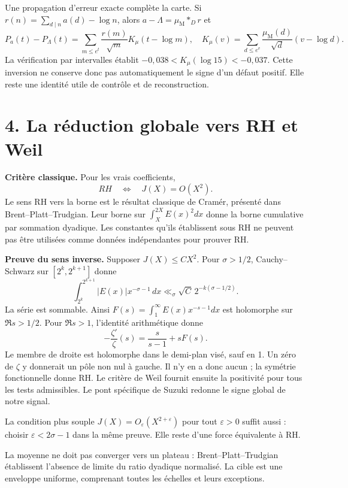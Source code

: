 \documentclass[
  11pt,
]{article}
\begin{document}
Une propagation d'erreur exacte complète la carte. Si
\(r(n)=\sum_{d\mid n}a(d)-\log n\), alors
\(a-\Lambda=\mu_{\mathrm M}*_{D}r\) et \[
P_a(t)-P_\Lambda(t)=\sum_{m\le e^t}\frac{r(m)}{\sqrt m}
K_\mu(t-\log m),
\quad K_\mu(v)=\sum_{d\le e^v}\frac{\mu_{\mathrm M}(d)}{\sqrt d}(v-\log d).
\] La vérification par intervalles établit
\(-0{,}038<K_\mu(\log15)<-0{,}037\). Cette inversion ne conserve donc
pas automatiquement le signe d'un défaut positif. Elle reste une
identité utile de contrôle et de reconstruction.

\hypertarget{la-ruxe9duction-globale-vers-rh-et-weil}{%
\section{4. La réduction globale vers RH et
Weil}\label{la-ruxe9duction-globale-vers-rh-et-weil}}

\textbf{Critère classique.} Pour les vrais coefficients, \[
RH\quad\Longleftrightarrow\quad J(X)=O(X^2).
\] Le sens RH vers la borne est le résultat classique de Cramér,
présenté dans Brent--Platt--Trudgian. Leur borne sur
\(\int_X^{2X}E(x)^2dx\) donne la borne cumulative par sommation
dyadique. Les constantes qu'ils établissent sous RH ne peuvent pas être
utilisées comme données indépendantes pour prouver RH.

\textbf{Preuve du sens inverse.} Supposer \(J(X)\le CX^2\). Pour
\(\sigma>1/2\), Cauchy--Schwarz sur \([2^k,2^{k+1}]\) donne \[
\int_{2^k}^{2^{k+1}}|E(x)|x^{-\sigma-1}\,dx
\ll_\sigma\sqrt C\,2^{-k(\sigma-1/2)}.
\] La série est sommable. Ainsi \(F(s)=\int_1^\infty E(x)x^{-s-1}dx\)
est holomorphe sur \(\Re s>1/2\). Pour \(\Re s>1\), l'identité
arithmétique donne \[
-\frac{\zeta'}{\zeta}(s)=\frac{s}{s-1}+sF(s).
\] Le membre de droite est holomorphe dans le demi-plan visé, sauf en 1.
Un zéro de \(\zeta\) y donnerait un pôle non nul à gauche. Il n'y en a
donc aucun ; la symétrie fonctionnelle donne RH. Le critère de Weil
fournit ensuite la positivité pour tous les tests admissibles. Le pont
spécifique de Suzuki redonne le signe global de notre signal.

La condition plus souple \(J(X)=O_\varepsilon(X^{2+\varepsilon})\) pour
tout \(\varepsilon>0\) suffit aussi : choisir \(\varepsilon<2\sigma-1\)
dans la même preuve. Elle reste d'une force équivalente à RH.

La moyenne ne doit pas converger vers un plateau :
Brent--Platt--Trudgian établissent l'absence de limite du ratio dyadique
normalisé. La cible est une enveloppe uniforme, comprenant toutes les
échelles et leurs exceptions.
\end{document}
